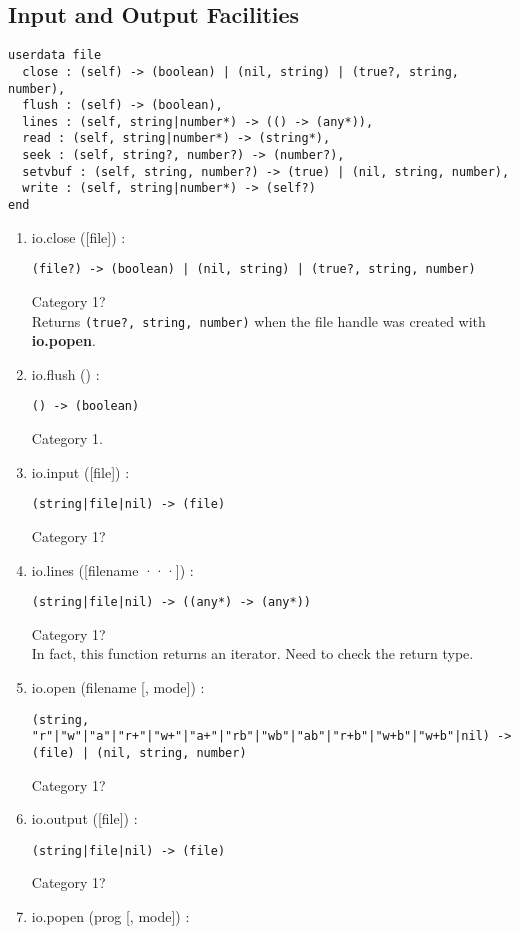 \subsection{Input and Output Facilities}

\begin{verbatim}
userdata file
  close : (self) -> (boolean) | (nil, string) | (true?, string, number),
  flush : (self) -> (boolean),
  lines : (self, string|number*) -> (() -> (any*)),
  read : (self, string|number*) -> (string*),
  seek : (self, string?, number?) -> (number?),
  setvbuf : (self, string, number?) -> (true) | (nil, string, number),
  write : (self, string|number*) -> (self?)
end
\end{verbatim}

\begin{enumerate}
\item io.close ([file]) :
\begin{verbatim}
(file?) -> (boolean) | (nil, string) | (true?, string, number)
\end{verbatim}
Category 1?
\\
Returns \texttt{(true?, string, number)} when the file handle
was created with \textbf{io.popen}.
\item io.flush () :
\begin{verbatim}
() -> (boolean)
\end{verbatim}
Category 1.
\item io.input ([file]) :
\begin{verbatim}
(string|file|nil) -> (file)
\end{verbatim}
Category 1?
\item io.lines ([filename ···]) :
\begin{verbatim}
(string|file|nil) -> ((any*) -> (any*))
\end{verbatim}
Category 1?
\\
In fact, this function returns an iterator. Need to check the return type.
\item io.open (filename [, mode]) :
\begin{verbatim}
(string,
"r"|"w"|"a"|"r+"|"w+"|"a+"|"rb"|"wb"|"ab"|"r+b"|"w+b"|"w+b"|nil) ->
(file) | (nil, string, number)
\end{verbatim}
Category 1?
\item io.output ([file]) :
\begin{verbatim}
(string|file|nil) -> (file)
\end{verbatim}
Category 1?
\item io.popen (prog [, mode]) :

\end{enumerate}
